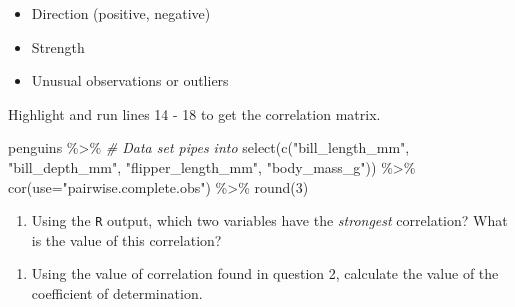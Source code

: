 \documentclass[
]{report}
\newenvironment{Shaded}{\begin{snugshade}}{\end{snugshade}}
\newcommand{\AttributeTok}[1]{\textcolor[rgb]{0.77,0.63,0.00}{#1}}
\newcommand{\CommentTok}[1]{\textcolor[rgb]{0.56,0.35,0.01}{\textit{#1}}}
\newcommand{\DecValTok}[1]{\textcolor[rgb]{0.00,0.00,0.81}{#1}}
\newcommand{\FunctionTok}[1]{\textcolor[rgb]{0.00,0.00,0.00}{#1}}
\newcommand{\NormalTok}[1]{#1}
\newcommand{\SpecialCharTok}[1]{\textcolor[rgb]{0.00,0.00,0.00}{#1}}
\newcommand{\StringTok}[1]{\textcolor[rgb]{0.31,0.60,0.02}{#1}}
\providecommand{\tightlist}{%
  \setlength{\itemsep}{0pt}\setlength{\parskip}{0pt}}
\begin{document}
\vspace{.4in}

\begin{itemize}
\tightlist
\item
  Direction (positive, negative)
\end{itemize}

\vspace{.4in}

\begin{itemize}
\tightlist
\item
  Strength
\end{itemize}

\vspace{.4in}

\begin{itemize}
\tightlist
\item
  Unusual observations or outliers
\end{itemize}

\vspace{.4in}

Highlight and run lines 14 - 18 to get the correlation matrix.

\begin{Shaded}
\begin{Highlighting}[]
\NormalTok{penguins }\SpecialCharTok{\%\textgreater{}\%}  \CommentTok{\# Data set pipes into}
  \FunctionTok{select}\NormalTok{(}\FunctionTok{c}\NormalTok{(}\StringTok{"bill\_length\_mm"}\NormalTok{, }\StringTok{"bill\_depth\_mm"}\NormalTok{, }
           \StringTok{"flipper\_length\_mm"}\NormalTok{, }\StringTok{"body\_mass\_g"}\NormalTok{)) }\SpecialCharTok{\%\textgreater{}\%}
  \FunctionTok{cor}\NormalTok{(}\AttributeTok{use=}\StringTok{"pairwise.complete.obs"}\NormalTok{) }\SpecialCharTok{\%\textgreater{}\%}
  \FunctionTok{round}\NormalTok{(}\DecValTok{3}\NormalTok{)}
\end{Highlighting}
\end{Shaded}

\begin{enumerate}
\def\labelenumi{\arabic{enumi}.}
\setcounter{enumi}{1}
\tightlist
\item
  Using the \texttt{R} output, which two variables have the \emph{strongest} correlation? What is the value of this correlation?
\end{enumerate}

\vspace{0.5in}

\begin{enumerate}
\def\labelenumi{\arabic{enumi}.}
\setcounter{enumi}{2}
\tightlist
\item
  Using the value of correlation found in question 2, calculate the value of the coefficient of determination.
\end{enumerate}
\end{document}
